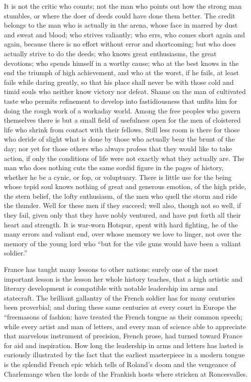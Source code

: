 \documentclass[a4paper]{amsbook}
\begin{document}
It is not the critic who counts; not the man who points out how the strong man stumbles, or where the doer of deeds could have done them better. The credit belongs to the man who is actually in the arena, whose face in marred by dust and sweat and blood; who strives valiantly; who errs, who comes short again and again, because there is no effort without error and shortcoming; but who does actually strive to do the deeds; who knows great enthusiasms, the great devotions; who spends himself in a worthy cause; who at the best knows in the end the triumph of high achievement, and who at the worst, if he fails, at least fails while daring greatly, so that his place shall never be with those cold and timid souls who neither know victory nor defeat. Shame on the man of cultivated taste who permits refinement to develop into fastidiousness that unfits him for doing the rough work of a workaday world. Among the free peoples who govern themselves there is but a small field of usefulness open for the men of cloistered life who shrink from contact with their fellows. Still less room is there for those who deride of slight what is done by those who actually bear the brunt of the day; nor yet for those others who always profess that they would like to take action, if only the conditions of life were not exactly what they actually are. The man who does nothing cuts the same sordid figure in the pages of history, whether he be a cynic, or fop, or voluptuary. There is little use for the being whose tepid soul knows nothing of great and generous emotion, of the high pride, the stern belief, the lofty enthusiasm, of the men who quell the storm and ride the thunder. Well for these men if they succeed; well also, though not so well, if they fail, given only that they have nobly ventured, and have put forth all their heart and strength. It is war-worn Hotspur, spent with hard fighting, he of the many errors and valiant end, over whose memory we love to linger, not over the memory of the young lord who “but for the vile guns would have been a valiant soldier.”

France has taught many lessons to other nations: surely one of the most important lesson is the lesson her whole history teaches, that a high artistic and literary development is compatible with notable leadership im arms and statecraft. The brilliant gallantry of the French soldier has for many centuries been proverbial; and during these same centuries at every court in Europe the “freemasons of fashion: have treated the French tongue as their common speech; while every artist and man of letters, and every man of science able to appreciate that marvelous instrument of precision, French prose, had turned toward France for aid and inspiration. How long the leadership in arms and letters has lasted is curiously illustrated by the fact that the earliest masterpiece in a modern tongue is the splendid French epic which tells of Roland's doom and the vengeance of Charlemange when the lords of the Frankish hosts where stricken at Roncesvalles.
\end{document}
